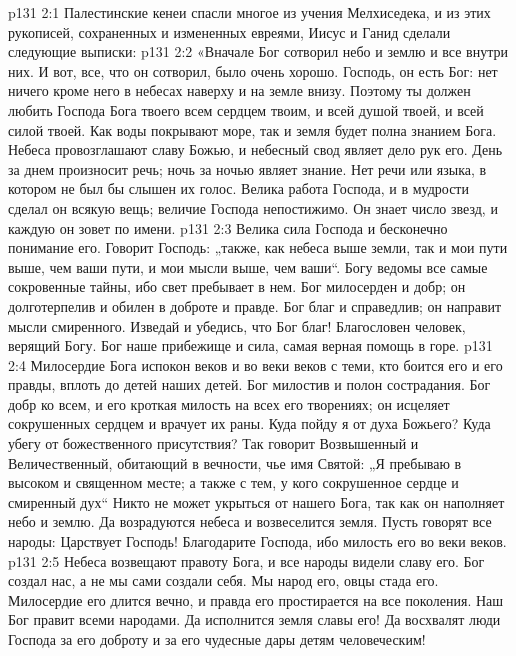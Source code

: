 \vs p131 2:1 Палестинские кенеи спасли многое из учения Мелхиседека, и из этих рукописей, сохраненных и измененных евреями, Иисус и Ганид сделали следующие выписки:
\vs p131 2:2 \pc «Вначале Бог сотворил небо и землю и все внутри них. И вот, все, что он сотворил, было очень хорошо. Господь, он есть Бог: нет ничего кроме него в небесах наверху и на земле внизу. Поэтому ты должен любить Господа Бога твоего всем сердцем твоим, и всей душой твоей, и всей силой твоей. Как воды покрывают море, так и земля будет полна знанием Бога. Небеса провозглашают славу Божью, и небесный свод являет дело рук его. День за днем произносит речь; ночь за ночью являет знание. Нет речи или языка, в котором не был бы слышен их голос. Велика работа Господа, и в мудрости сделал он всякую вещь; величие Господа непостижимо. Он знает число звезд, и каждую он зовет по имени.
\vs p131 2:3 Велика сила Господа и бесконечно понимание его. Говорит Господь: „также, как небеса выше земли, так и мои пути выше, чем ваши пути, и мои мысли выше, чем ваши“. Богу ведомы все самые сокровенные тайны, ибо свет пребывает в нем. Бог милосерден и добр; он долготерпелив и обилен в доброте и правде. Бог благ и справедлив; он направит мысли смиренного. Изведай и убедись, что Бог благ! Благословен человек, верящий Богу. Бог наше прибежище и сила, самая верная помощь в горе.
\vs p131 2:4 Милосердие Бога испокон веков и во веки веков с теми, кто боится его и его правды, вплоть до детей наших детей. Бог милостив и полон сострадания. Бог добр ко всем, и его кроткая милость на всех его творениях; он исцеляет сокрушенных сердцем и врачует их раны. Куда пойду я от духа Божьего? Куда убегу от божественного присутствия? Так говорит Возвышенный и Величественный, обитающий в вечности, чье имя Святой: „Я пребываю в высоком и священном месте; а также с тем, у кого сокрушенное сердце и смиренный дух“ Никто не может укрыться от нашего Бога, так как он наполняет небо и землю. Да возрадуются небеса и возвеселится земля. Пусть говорят все народы: Царствует Господь! Благодарите Господа, ибо милость его во веки веков.
\vs p131 2:5 Небеса возвещают правоту Бога, и все народы видели славу его. Бог создал нас, а не мы сами создали себя. Мы народ его, овцы стада его. Милосердие его длится вечно, и правда его простирается на все поколения. Наш Бог правит всеми народами. Да исполнится земля славы его! Да восхвалят люди Господа за его доброту и за его чудесные дары детям человеческим!
